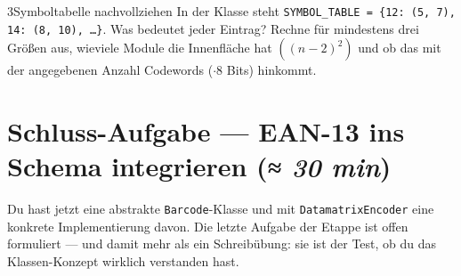 \begin{bleistiftuebung}{3}{Symboltabelle nachvollziehen}
In der Klasse steht \texttt{SYMBOL\_TABLE = \{12: (5, 7), 14: (8, 10),
\dots\}}. Was bedeutet jeder Eintrag? Rechne für mindestens drei
Größen aus, wieviele Module die Innenfläche hat $((n-2)^2)$ und ob
das mit der angegebenen Anzahl Codewords ($\cdot 8$ Bits) hinkommt.
\end{bleistiftuebung}

\section{Schluss-Aufgabe — EAN-13 ins Schema integrieren \normalfont(\textit{≈ 30 min})}

Du hast jetzt eine abstrakte \texttt{Barcode}-Klasse und mit
\texttt{DatamatrixEncoder} eine konkrete Implementierung davon.
Die letzte Aufgabe der Etappe ist offen formuliert — und damit
mehr als ein Schreibübung: sie ist der Test, ob du das
Klassen-Konzept wirklich verstanden hast.

